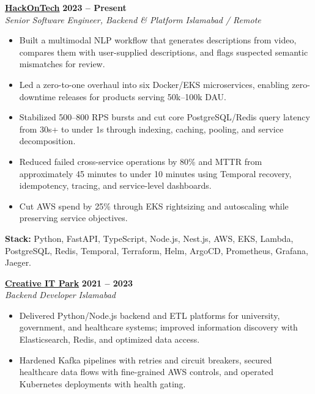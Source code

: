 \documentclass[10pt,letterpaper]{article}
\newcommand{\role}[4]{%
  \textbf{#1} \hfill \textbf{#2}\\
  \textit{#3} \hfill \textit{#4}\\[-2pt]
}
\begin{document}
\role
  {\href{https://hackontech.com/}{HackOnTech}}
  {2023 -- Present}
  {Senior Software Engineer, Backend \& Platform}
  {Islamabad / Remote}

\begin{itemize}
  \item Built a multimodal NLP workflow that generates descriptions from video,
  compares them with user-supplied descriptions, and flags suspected semantic
  mismatches for review.

  \item Led a zero-to-one overhaul into six Docker/EKS microservices, enabling
  zero-downtime releases for products serving 50k--100k DAU.

  \item Stabilized 500--800 RPS bursts and cut core PostgreSQL/Redis query
  latency from 30s+ to under 1s through indexing, caching, pooling, and service
  decomposition.

  \item Reduced failed cross-service operations by 80\% and MTTR from
  approximately 45 minutes to under 10 minutes using Temporal recovery,
  idempotency, tracing, and service-level dashboards.

  \item Cut AWS spend by 25\% through EKS rightsizing and autoscaling while
  preserving service objectives.
\end{itemize}

\vspace{1pt}
{\footnotesize
\textbf{Stack:}
Python, FastAPI, TypeScript, Node.js, Nest.js, AWS, EKS, Lambda, PostgreSQL,
Redis, Temporal, Terraform, Helm, ArgoCD, Prometheus, Grafana, Jaeger.
}

\vspace{3pt}

\role
  {\href{https://creativeitpark.org/}{Creative IT Park}}
  {2021 -- 2023}
  {Backend Developer}
  {Islamabad}

\begin{itemize}
  \item Delivered Python/Node.js backend and ETL platforms for university,
  government, and healthcare systems; improved information discovery with
  Elasticsearch, Redis, and optimized data access.

  \item Hardened Kafka pipelines with retries and circuit breakers, secured
  healthcare data flows with fine-grained AWS controls, and operated Kubernetes
  deployments with health gating.
\end{itemize}
\end{document}
